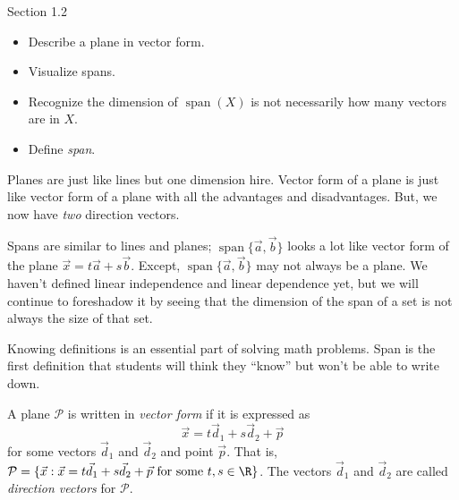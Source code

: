 \documentclass{problemset}
\DeclareMathOperator{\Span}{span}
\begin{document}
\begin{lesson}
	\newpage

	Section 1.2

	\begin{itemize}
		\item Describe a plane in vector form.
		\item Visualize spans.
		\item Recognize the dimension of $\Span(X)$ is not necessarily how many vectors
			are in $X$.
		\item Define \emph{span}.
	\end{itemize}

	Planes are just like lines but one dimension hire. Vector form of a plane is just like
	vector form of a plane with all the advantages and disadvantages. But, we now have
	\emph{two} direction vectors.

	Spans are similar to lines and planes; $\Span\{\vec a,\vec b\}$ looks a lot like
	vector form of the plane
	$\vec x=t\vec a+s\vec b$. Except, $\Span\{\vec a,\vec b\}$ may not always be a plane.
	We haven't defined linear independence and linear dependence yet, but we will continue to
	foreshadow it by seeing that the dimension of the span of a set is not always the size of
	that set.

	Knowing definitions is an essential part of solving math problems. Span is
	the first definition that students will think they ``know'' but won't be
	able to write down.

	\newpage
\end{lesson}

	\begin{definition}
		A plane $\mathcal P$ is written in \emph{vector form} if it is expressed
		as
		\[
			\vec x=t\vec d_1 +s\vec d_2+\vec p
		\]
		for some vectors $\vec d_1$ and $\vec d_2$ and 
		point $\vec p$. That is, $\mathcal P = \{\vec x: \vec x=
		t\vec d_1+s\vec d_2 +\vec p\text{ for some } t,s\in\R \}$. The vectors 
		$\vec d_1$ and $\vec d_2$ are called \emph{direction
		vectors} for $\mathcal P$.
	\end{definition}
\end{document}
